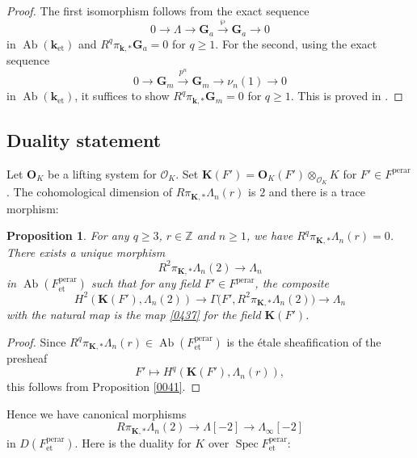 \documentclass{amsart}
\newtheorem{Prop}[Thm]{Proposition}
\theoremstyle{remark}
\numberwithin{equation}{subsection}
\newcommand{\Order}{\mathcal{O}}
\newcommand{\tensor}{\mathbin{\otimes}}
\newcommand{\Z}{\mathbb{Z}}
\newcommand{\et}{\mathrm{et}}
\newcommand{\Gm}{\mathbf{G}_{m}}
\newcommand{\Ga}{\mathbf{G}_{a}}
\newcommand{\perar}{\mathrm{perar}}
\newcommand{\alg}[1]{\mathbf{#1}}
\DeclareMathOperator{\Spec}{Spec}
\DeclareMathOperator{\Ab}{Ab}
\begin{document}
\begin{proof}
	The first isomorphism follows from the exact sequence
		\[
				0
			\to
				\Lambda
			\to
				\Ga
			\stackrel{\wp}{\to}
				\Ga
			\to
				0
		\]
	in $\Ab(\alg{k}_{\et})$ and $R^{q} \pi_{\alg{k}, \ast} \Ga = 0$ for $q \ge 1$.
	For the second, using the exact sequence
		\[
				0
			\to
				\Gm
			\stackrel{p^{n}}{\to}
				\Gm
			\to
				\nu_{n}(1)
			\to
				0
		\]
	in $\Ab(\alg{k}_{\et})$, it suffices to show $R^{q} \pi_{\alg{k}, \ast} \Gm = 0$ for $q \ge 1$.
	This is proved in \cite[Proof of Proposition 9.1]{Suz21}.
\end{proof}


\subsection{Duality statement}

Let $\alg{O}_{K}$ be a lifting system for $\Order_{K}$.
Set $\alg{K}(F') = \alg{O}_{K}(F') \tensor_{\Order_{K}} K$ for $F' \in F^{\perar}$.
The cohomological dimension of $R \pi_{\alg{K}, \ast} \Lambda_{n}(r)$ is $2$
and there is a trace morphism:

\begin{Prop} \label{0500}
	For any $q \ge 3$, $r \in \Z$ and $n \ge 1$, we have
	$R^{q} \pi_{\alg{K}, \ast} \Lambda_{n}(r) = 0$.
	There exists a unique morphism
		\begin{equation} \label{0358}
				R^{2} \pi_{\alg{K}, \ast} \Lambda_{n}(2)
			\to
				\Lambda_{n}
		\end{equation}
	in $\Ab(F^{\perar}_{\et})$ such that for any field $F' \in F^{\perar}$,
	the composite
		\[
				H^{2}(\alg{K}(F'), \Lambda_{n}(2))
			\to
				\Gamma \bigl(
					F',
					R^{2} \pi_{\alg{K}, \ast} \Lambda_{n}(2)
				\bigr)
			\to
				\Lambda_{n}
		\]
	with the natural map is the map \eqref{0437} for the field $\alg{K}(F')$.
\end{Prop}

\begin{proof}
	Since $R^{q} \pi_{\alg{K}, \ast} \Lambda_{n}(r) \in \Ab(F^{\perar}_{\et})$ is
	the \'etale sheafification of the presheaf
		\[
				F'
			\mapsto
				H^{q}(\alg{K}(F'), \Lambda_{n}(r)),
		\]
	this follows from Proposition \ref{0041}.
\end{proof}

Hence we have canonical morphisms
	\[
			R \pi_{\alg{K}, \ast} \Lambda_{n}(2)
		\to
			\Lambda[-2]
		\to
			\Lambda_{\infty}[-2]
	\]
in $D(F^{\perar}_{\et})$.
Here is the duality for $K$ over $\Spec F^{\perar}_{\et}$:
\end{document}
